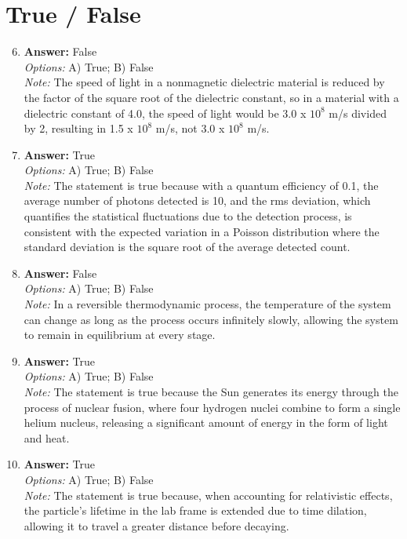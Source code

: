 \documentclass[12pt]{article}
\begin{document}
\section*{True / False}
\begin{enumerate}[label=\arabic*.]
\setcounter{enumi}{5}
\item \textbf{Answer:} False
\\ \textit{Options:} A) True; B) False
\\ \textit{Note:} The speed of light in a nonmagnetic dielectric material is reduced by the factor of the square root of the dielectric constant, so in a material with a dielectric constant of 4.0, the speed of light would be 3.0 x $10^8$ m/s divided by 2, resulting in 1.5 x $10^8$ m/s, not 3.0 x $10^8$ m/s.
\item \textbf{Answer:} True
\\ \textit{Options:} A) True; B) False
\\ \textit{Note:} The statement is true because with a quantum efficiency of 0.1, the average number of photons detected is 10, and the rms deviation, which quantifies the statistical fluctuations due to the detection process, is consistent with the expected variation in a Poisson distribution where the standard deviation is the square root of the average detected count.
\item \textbf{Answer:} False
\\ \textit{Options:} A) True; B) False
\\ \textit{Note:} In a reversible thermodynamic process, the temperature of the system can change as long as the process occurs infinitely slowly, allowing the system to remain in equilibrium at every stage.
\item \textbf{Answer:} True
\\ \textit{Options:} A) True; B) False
\\ \textit{Note:} The statement is true because the Sun generates its energy through the process of nuclear fusion, where four hydrogen nuclei combine to form a single helium nucleus, releasing a significant amount of energy in the form of light and heat.
\item \textbf{Answer:} True
\\ \textit{Options:} A) True; B) False
\\ \textit{Note:} The statement is true because, when accounting for relativistic effects, the particle's lifetime in the lab frame is extended due to time dilation, allowing it to travel a greater distance before decaying.
\end{enumerate}
\end{document}

